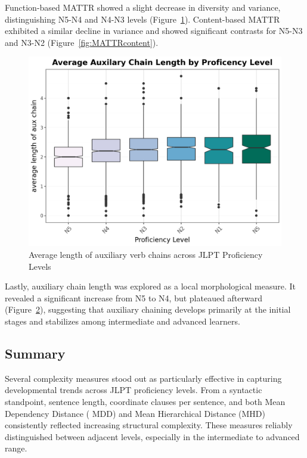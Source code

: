 \begin{figure}[htbp]
\begin{minipage}{.48\textwidth}
        \caption[MATTR function]{}
\label{fig:MATTRfunction}
\end{minipage}
    \end{figure}

Function-based MATTR showed a slight decrease in diversity and
variance, distinguishing N5-N4 and N4-N3 levels (Figure~\ref{fig:MATTRfunction}). Content-based MATTR exhibited a
similar decline in variance and showed significant contrasts for N5-N3 and N3-N2 (Figure~\ref{fig:MATTRcontent}).

\begin{figure}[htpb]
\centering
\includegraphics[scale=.5]{img/auxchains}
\caption[Average length of auxiliary verb chains across JLPT Proficiency Levels]{Average length of auxiliary verb chains across JLPT Proficiency Levels}
\label{fig:auxchain}
\end{figure}
Lastly, auxiliary chain length was explored as a local morphological measure. It revealed a significant increase
from N5 to N4, but plateaued afterward (Figure~\ref{fig:auxchain}), suggesting that auxiliary chaining develops
primarily
at the
initial stages
and stabilizes among intermediate and advanced learners.


\subsection{Summary}
Several complexity measures stood out as particularly effective in capturing developmental trends across JLPT
proficiency levels.
From a syntactic standpoint, sentence length, coordinate clauses per sentence, and both Mean Dependency Distance (
MDD) and Mean Hierarchical Distance (MHD) consistently reflected increasing structural complexity. These measures
reliably distinguished between adjacent levels, especially in the intermediate to advanced range.

